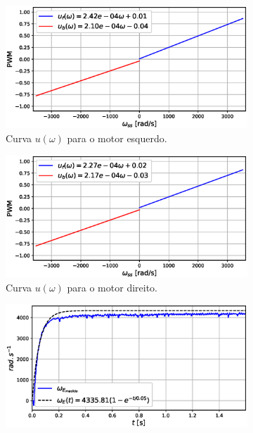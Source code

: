 \begin{figure}[H]
    \begin{subfigure}{.5\textwidth}
    \centering
    \includegraphics[width=\textwidth]{figuras/resultados/exp03/curva_feedforward_esquerdo100.eps}
    \caption{Curva $u(\omega)$ para o motor esquerdo.}
    \label{fig:exp03:curva_feedforward_esquerdo}
    \end{subfigure}
    \hfill
    \begin{subfigure}{.5\textwidth}
    \centering
    \includegraphics[width=\textwidth]{figuras/resultados/exp03/curva_feedforward_direito100.eps}
    \caption{Curva $u(\omega)$ para o motor direito.}
    \label{fig:exp03:curva_feedforward_direito}
    \end{subfigure}
    \begin{subfigure}{.5\textwidth}
    \centering
    \includegraphics[width=\textwidth]{figuras/resultados/exp03/regressao_vs_medido_esquerdo100.eps}

\end{subfigure}
\end{figure}
